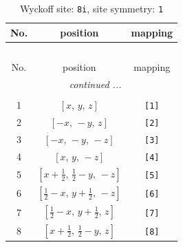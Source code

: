 \documentclass[fleqn,8pt]{jsarticle}
\begin{document}
\renewcommand{\arraystretch}{1.2}
\begin{longtable}{ccc}
\caption{Wyckoff site: {\tt 8i}, site symmetry: {\tt 1}}
 \\
 \hline \hline
No. & position & mapping \\ \hline \endfirsthead

\multicolumn{2}{l}{\tablename\ \thetable{}} \\
 \hline \hline
No. & position & mapping \\ \hline \endhead

 \hline \hline
\multicolumn{2}{r}{\footnotesize\it continued ...} \\ \endfoot

 \hline \hline
\multicolumn{2}{r}{} \\ \endlastfoot

1 & $\left[ x,\, y,\, z \right]$ & {\tt [1]} \\ \hline
2 & $\left[ - x,\, - y,\, z \right]$ & {\tt [2]} \\ \hline
3 & $\left[ - x,\, - y,\, - z \right]$ & {\tt [3]} \\ \hline
4 & $\left[ x,\, y,\, - z \right]$ & {\tt [4]} \\ \hline
5 & $\left[ x + \frac{1}{2},\, \frac{1}{2} - y,\, - z \right]$ & {\tt [5]} \\ \hline
6 & $\left[ \frac{1}{2} - x,\, y + \frac{1}{2},\, - z \right]$ & {\tt [6]} \\ \hline
7 & $\left[ \frac{1}{2} - x,\, y + \frac{1}{2},\, z \right]$ & {\tt [7]} \\ \hline
8 & $\left[ x + \frac{1}{2},\, \frac{1}{2} - y,\, z \right]$ & {\tt [8]} \\
\end{longtable}
\end{document}
